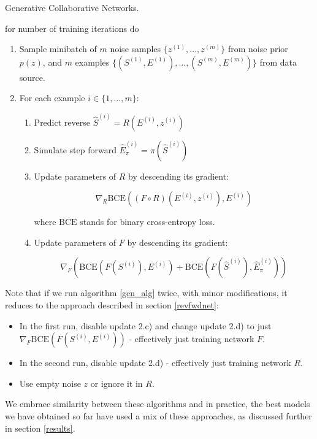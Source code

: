 \documentclass[conference]{IEEEtran}
\begin{document}
\begin{algorithm}
    \label{gcn_alg}
    \caption{Generative Collaborative Networks.}
    for number of training iterations do
    \begin{enumerate}
    \item Sample minibatch of $m$ noise samples $\{z^{(1)}
    , . . . , z^{(m)}\}$ from noise prior $p(z)$, and $m$ examples $\{(S^{(1)}, E
    ^{(1)}), . . . , (S^{(m)}, E^{(m)})\}$ from data source.
    \item For each example $i\in\{1,...,m\}$:
    \begin{enumerate}
        \item Predict reverse $\hat S^{(i)} = R(E^{(i)}, z^{(i)})$
        \item Simulate step forward $\hat E_\pi^{(i)} = \pi(\hat S^{(i)})$
        \item Update parameters of $R$ by descending its gradient:
        
        $$\nabla_R \text{BCE}((F \circ R) (E^{(i)}, z^{(i)}), E^{(i)}) $$
        
        where $\text{BCE}$ stands for binary cross-entropy loss.
        
        \item Update parameters of $F$ by descending its gradient:
        
        $$\nabla_F \left(\text{BCE}(F(S^{(i)}), E^{(i)}) + \text{BCE}(F(\hat S^{(i)}), \hat E_{\pi}^{(i)})\right)$$
    \end{enumerate}
    \end{enumerate}
\end{algorithm} 

Note that if we run algorithm \ref{gcn_alg} twice, with minor modifications, it reduces to the approach described in section \ref{revfwdnet}:
\begin{itemize}
    \item In the first run, disable update 2.c) and change update 2.d) to just $\nabla_F \text{BCE}(F(S^{(i)}, E^{(i)}))$ - effectively just training network $F$.
    \item In the second run, disable update 2.d) - effectively just training network $R$.
    \item Use empty noise $z$ or ignore it in $R$.
\end{itemize}

We embrace similarity between these algorithms and in practice, the best models we have obtained so far have used a mix of these approaches, as discussed further in section \ref{results}.
\end{document}
